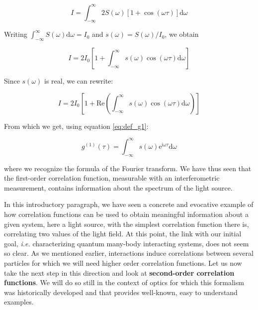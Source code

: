 \begin{equation}
    I=\int_{-\infty}^{\infty} 2 S(\omega)[1+\cos (\omega \tau)] \mathrm{d} \omega
\end{equation}

Writing $\int_{-\infty}^{\infty} S(\omega) \mathrm{d} \omega=I_{0}$ and $s(\omega)=S(\omega) / I_{0}$, we obtain

\begin{equation}
    I=2 I_{0}\left[1+\int_{-\infty}^{\infty} s(\omega) \cos (\omega \tau) \mathrm{d} \omega\right]
\end{equation}

Since $s(\omega)$ is real, we can rewrite:

\begin{equation}
    I=2 I_{0}\left[1+\mathrm{Re} \left(\int_{-\infty}^{\infty} s(\omega) \cos (\omega \tau) \mathrm{d} \omega\right)\right]
\end{equation}

From which we get, using equation \ref{eq:def_g1}:

\begin{equation}
    g^{(1)}(\tau)=\int_{-\infty}^{\infty} s(\omega) \mathrm{e}^{\mathrm{i} \omega \tau} \mathrm{d} \omega
\end{equation}

where we recognize the formula of the Fourier transform. We have thus seen that the first-order correlation function, measurable with an interferometric measurement, contains information about the spectrum of the light source. 




In this introductory paragraph, we have seen a concrete and evocative example of how correlation functions can be used to obtain meaningful information about a given system, here a light source, with the simplest correlation function there is, correlating two values of the light field. At this point, the link with our initial goal, {\it i.e.} characterizing quantum many-body interacting systems, does not seem so clear. As we mentioned earlier, interactions induce correlations between several particles for which we will need higher order correlation functions. Let us now take the next step in this direction and look at \textbf{second-order correlation functions}. We will do so still in the context of optics for which this formalism was historically developed and that provides well-known, easy to understand examples.

